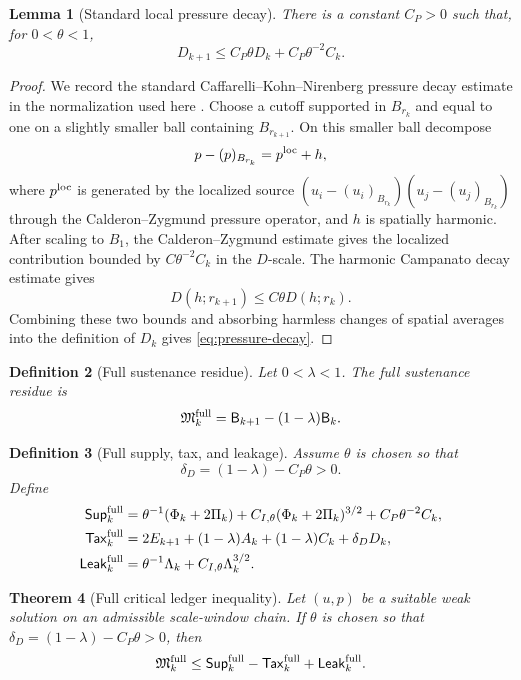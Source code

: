 \documentclass[11pt]{article}
\numberwithin{equation}{section}
\newtheorem{theorem}{Theorem}[section]
\newtheorem{lemma}[theorem]{Lemma}
\newtheorem{definition}[theorem]{Definition}
\newcommand{\Supp}{\mathsf{Sup}}
\newcommand{\Tax}{\mathsf{Tax}}
\newcommand{\Leak}{\mathsf{Leak}}
\newcommand{\Mres}{\mathfrak M}
\newcommand{\Bbad}{\mathsf B}
\begin{document}
\begin{lemma}[Standard local pressure decay]\label{lem:pressure-decay}
There is a constant $C_P>0$ such that, for $0<\theta<1$,
\begin{equation}\label{eq:pressure-decay}
D_{k+1}\leq C_P\theta D_k+C_P\theta^{-2}C_k.
\end{equation}
\end{lemma}

\begin{proof}
We record the standard Caffarelli--Kohn--Nirenberg pressure decay estimate
in the normalization used here \cite{CKN1982,SohrWahl1986,Wolf2017,SereginLectureNotes}.  Choose a cutoff supported in \(B_{r_k}\)
and equal to one on a slightly smaller ball containing \(B_{r_{k+1}}\).
On this smaller ball decompose
\[
p-(p)_{B_{r_k}}=p^{\rm loc}+h,
\]
where \(p^{\rm loc}\) is generated by the localized source
\((u_i-(u_i)_{B_{r_k}})(u_j-(u_j)_{B_{r_k}})\) through the
Calderon--Zygmund pressure operator, and \(h\) is spatially harmonic.
After scaling to \(B_1\), the Calderon--Zygmund estimate gives the
localized contribution bounded by \(C\theta^{-2}C_k\) in the \(D\)-scale.
The harmonic Campanato decay estimate gives
\[
        D(h;r_{k+1})\le C\theta D(h;r_k).
\]
Combining these two bounds and absorbing harmless changes of spatial
averages into the definition of \(D_k\) gives
\eqref{eq:pressure-decay}.
\end{proof}

\begin{definition}[Full sustenance residue]\label{def:full-residue}
Let $0<\lambda<1$.  The full sustenance residue is
\[
\Mres_k^{\rm full}=\Bbad_{k+1}-(1-\lambda)\Bbad_k.
\]
\end{definition}

\begin{definition}[Full supply, tax, and leakage]\label{def:full-ledger-terms}
Assume $\theta$ is chosen so that
\[
\delta_D=(1-\lambda)-C_P\theta>0.
\]
Define
\begin{align*}
\Supp_k^{\rm full}
&=\theta^{-1}(\Phi_k+2\Pi_k)
+C_{I,\theta}(\Phi_k+2\Pi_k)^{3/2}
+C_P\theta^{-2}C_k,\\
\Tax_k^{\rm full}
&=2E_{k+1}+(1-\lambda)A_k+(1-\lambda)C_k+\delta_DD_k,\\
\Leak_k^{\rm full}
&=\theta^{-1}\Lambda_k+C_{I,\theta}\Lambda_k^{3/2}.
\end{align*}
\end{definition}

\begin{theorem}[Full critical ledger inequality]\label{thm:full-ledger}
Let $(u,p)$ be a suitable weak solution on an admissible scale-window chain.  If $\theta$ is chosen so that $\delta_D=(1-\lambda)-C_P\theta>0$, then
\begin{equation}\label{eq:full-ledger}
\Mres_k^{\rm full}
\leq
\Supp_k^{\rm full}-\Tax_k^{\rm full}+\Leak_k^{\rm full}.
\end{equation}
\end{theorem}
\end{document}
